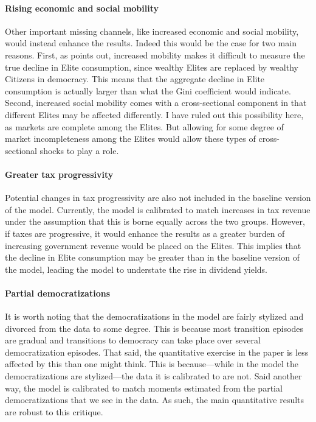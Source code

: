 \paragraph{Rising economic and social mobility}
Other important missing channels, like increased economic and social mobility, would instead enhance the results. Indeed this would be the case for two main reasons. First, as \cite{Acemoglu2015} points out, increased mobility makes it difficult to measure the true decline in Elite consumption, since wealthy Elites are replaced by wealthy Citizens in democracy. This means that the aggregate decline in Elite consumption is actually larger than what the Gini coefficient would indicate. Second, increased social mobility comes with a cross-sectional component in that different Elites may be affected differently. I have ruled out this possibility here, as markets are complete among the Elites. But allowing for some degree of market incompleteness among the Elites would allow these types of cross-sectional shocks to play a role.

\paragraph{Greater tax progressivity}
Potential changes in tax progressivity are also not included in the baseline version of the model. Currently, the model is calibrated to match increases in tax revenue under the assumption that this is borne equally across the two groups. However, if taxes are progressive, it would enhance the results as a greater burden of increasing government revenue would be placed on the Elites. This implies that the decline in Elite consumption may be greater than in the baseline version of the model, leading the model to understate the rise in dividend yields.

\paragraph{Partial democratizations}
\label{par:partial_dem}
It is worth noting that the democratizations in the model are fairly stylized and divorced from the data to some degree. This is because most transition episodes are gradual and transitions to democracy can take place over several democratization episodes. That said, the quantitative exercise in the paper is less affected by this than one might think. This is because---while in the model the democratizations are stylized---the data it is calibrated to are not.  Said another way, the model is calibrated to match moments estimated from the partial democratizations that we see in the data. As such, the main quantitative results are robust to this critique.


